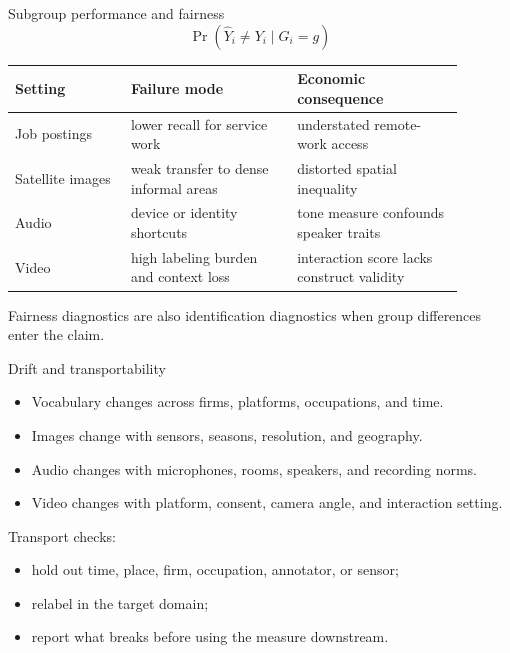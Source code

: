\documentclass[aspectratio=169,11pt]{beamer}
\newcommand{\1}{\mathbf{1}}
\begin{document}
\begin{frame}{Subgroup performance and fairness}
\small
\[
\Pr(\widehat Y_i\neq Y_i\mid G_i=g)
\]

\begin{tabular}{p{0.23\linewidth} p{0.33\linewidth} p{0.33\linewidth}}
\toprule
Setting & Failure mode & Economic consequence \\
\midrule
Job postings & lower recall for service work & understated remote-work access \\
Satellite images & weak transfer to dense informal areas & distorted spatial inequality \\
Audio & device or identity shortcuts & tone measure confounds speaker traits \\
Video & high labeling burden and context loss & interaction score lacks construct validity \\
\bottomrule
\end{tabular}

\medskip
Fairness diagnostics are also identification diagnostics when group differences enter the claim.
\end{frame}

\begin{frame}{Drift and transportability}
\small
\begin{itemize}
    \item Vocabulary changes across firms, platforms, occupations, and time.
    \item Images change with sensors, seasons, resolution, and geography.
    \item Audio changes with microphones, rooms, speakers, and recording norms.
    \item Video changes with platform, consent, camera angle, and interaction setting.
\end{itemize}

\medskip
Transport checks:
\begin{itemize}
    \item hold out time, place, firm, occupation, annotator, or sensor;
    \item relabel in the target domain;
    \item report what breaks before using the measure downstream.
\end{itemize}
\end{frame}
\end{document}
